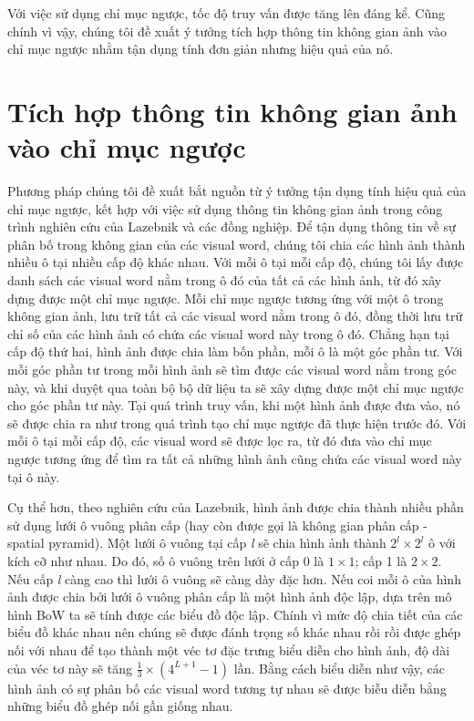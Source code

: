 Với việc sử dụng chỉ mục ngược, tốc độ truy vấn được tăng lên đáng kể. Cũng chính vì vậy, chúng tôi đề xuất ý tưởng tích hợp thông tin không gian ảnh vào chỉ mục ngược nhằm tận dụng tính đơn giản nhưng hiệu quả của nó.

\section{Tích hợp thông tin không gian ảnh vào chỉ mục ngược}
\label{sec:intergrated}
Phương pháp chúng tôi đề xuất bắt nguồn từ ý tưởng tận dụng tính hiệu quả của chỉ mục ngược, kết hợp với việc sử dụng thông tin không gian ảnh trong công trình nghiên cứu của Lazebnik và các đồng nghiệp\cite{lazebnik2006beyond}. Để tận dụng thông tin về sự phân bố trong không gian của các visual word, chúng tôi chia các hình ảnh thành nhiều ô tại nhiều cấp độ khác nhau. Với mỗi ô tại mỗi cấp độ, chúng tôi lấy được danh sách các visual word nằm trong ô đó của tất cả các hình ảnh, từ đó xây dựng được một chỉ mục ngược. Mỗi chỉ mục ngược tương ứng với một ô trong không gian ảnh, lưu trữ tất cả các visual word nằm trong ô đó, đồng thời lưu trữ chỉ số của các hình ảnh có chứa các visual word này trong ô đó. Chẳng hạn tại cấp độ thứ hai, hình ảnh được chia làm bốn phần, mỗi ô là một góc phần tư. Với mỗi góc phần tư trong mỗi hình ảnh sẽ tìm được các visual word nằm trong góc này, và khi duyệt qua toàn bộ bộ dữ liệu ta sẽ xây dựng được một chỉ mục ngược cho góc phần tư này. Tại quá trình truy vấn, khi một hình ảnh được đưa vào, nó sẽ được chia ra như trong quá trình tạo chỉ mục ngược đã thực hiện trước đó. Với mỗi ô tại mỗi cấp độ, các visual word sẽ được lọc ra, từ đó đưa vào chỉ mục ngược tương ứng để tìm ra tất cả những hình ảnh cũng chứa các visual word này tại ô này. 

Cụ thể hơn, theo nghiên cứu của Lazebnik, hình ảnh được chia thành nhiều phần sử dụng lưới ô vuông phân cấp (hay còn được gọi là không gian phân cấp - spatial pyramid). Một lưới ô vuông tại cấp \textit{l} sẽ chia hình ảnh thành $2^l \times 2^l$ ô với kích cỡ như nhau. Do đó, số ô vuông trên lưới ở cấp 0 là $1 \times 1$; cấp 1 là $2 \times 2$. Nếu cấp \textit{l} càng cao thì lưới ô vuông sẽ càng dày đặc hơn. Nếu coi mỗi ô của hình ảnh được chia bởi lưới ô vuông phân cấp là một hình ảnh độc lập, dựa trên mô hình BoW ta sẽ tính được các biểu đồ độc lập. Chính vì mức độ chia tiết của các biểu đồ khác nhau nên chúng sẽ được đánh trọng số khác nhau rồi rồi được ghép nối với nhau để tạo thành một véc tơ đặc trưng biểu diễn cho hình ảnh, độ dài của véc tơ này sẽ tăng $\frac{1}{3}\times(4^{L+1} - 1)$ lần. Bằng cách biểu diễn như vậy, các hình ảnh có sự phân bố các visual word tương tự nhau sẽ được biễu diễn bằng những biểu đồ ghép nối gần giống nhau.

